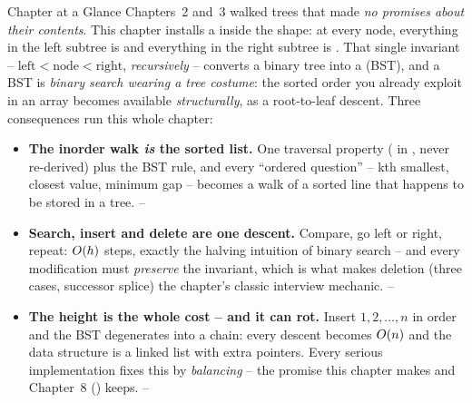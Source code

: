
\begin{chaptertheorybox}{Chapter at a Glance}
Chapters~2 and~3 walked trees that made \emph{no promises about their contents}. This chapter
installs a  inside the shape: at every node, everything in the left subtree is
 and everything in the right subtree is . That single invariant --
$\text{left} < \text{node} < \text{right}$, \emph{recursively} -- converts a binary tree into a
 (BST), and a BST is \emph{binary search wearing a tree costume}: the
sorted order you already exploit in an array becomes available \emph{structurally}, as a
root-to-leaf descent. Three consequences run this whole chapter:
\begin{itemize}[nosep]
  \item \textbf{The inorder walk \emph{is} the sorted list.} One traversal property
        ( in , never re-derived) plus the BST rule, and every
        ``ordered question'' -- kth smallest, closest value, minimum gap -- becomes a walk of a
        sorted line that happens to be stored in a tree. \hfill {}--
  \item \textbf{Search, insert and delete are one descent.} Compare, go left or right, repeat:
        $O(h)$ steps, exactly the halving intuition of binary search -- and every modification
        must \emph{preserve} the invariant, which is what makes deletion (three cases, successor
        splice) the chapter's classic interview mechanic. \hfill {}--
  \item \textbf{The height is the whole cost -- and it can rot.} Insert $1,2,\dots,n$ in order and
        the BST degenerates into a chain: every descent becomes $O(n)$ and the data structure
        is a linked list with extra pointers. Every serious implementation fixes this by
        \emph{balancing} -- the promise this chapter makes and Chapter~8 () keeps.
        \hfill {}--
\end{itemize}


\end{chaptertheorybox}
